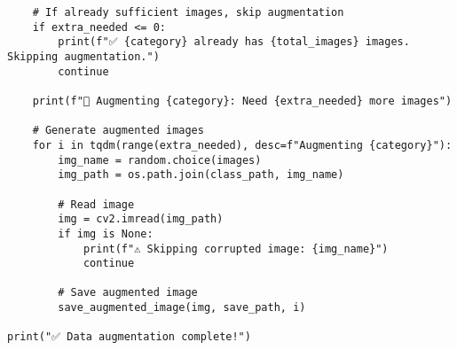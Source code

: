 \documentclass{article}
\begin{document}
\begin{lstlisting}
    # If already sufficient images, skip augmentation
    if extra_needed <= 0:
        print(f"✅ {category} already has {total_images} images. Skipping augmentation.")
        continue

    print(f"📢 Augmenting {category}: Need {extra_needed} more images")

    # Generate augmented images
    for i in tqdm(range(extra_needed), desc=f"Augmenting {category}"):
        img_name = random.choice(images)
        img_path = os.path.join(class_path, img_name)

        # Read image
        img = cv2.imread(img_path)
        if img is None:
            print(f"⚠️ Skipping corrupted image: {img_name}")
            continue

        # Save augmented image
        save_augmented_image(img, save_path, i)

print("✅ Data augmentation complete!")
\end{lstlisting}
\end{document}
